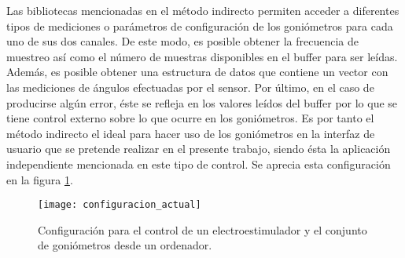 Las bibliotecas mencionadas en el método indirecto permiten acceder a diferentes tipos de mediciones o parámetros de configuración de los goniómetros para cada uno de sus dos canales. De este modo, es posible obtener la frecuencia de muestreo así como el número de muestras disponibles en el buffer para ser leídas. Además, es posible obtener una estructura de datos que contiene un vector con las mediciones de ángulos efectuadas por el sensor. Por último, en el caso de producirse algún error, éste se refleja en los valores leídos del buffer por lo que se tiene control externo sobre lo que ocurre en los goniómetros. Es por tanto el método indirecto el ideal para hacer uso de los goniómetros en la interfaz de usuario que se pretende realizar en el presente trabajo, siendo ésta la aplicación independiente mencionada en este tipo de control. Se aprecia esta configuración en la figura \ref{fig:configuracion_actual}.\\

\begin{figure}[!htb]
\centering
\texttt{[image: configuracion\_actual]}
  \caption{Configuración para el control de un electroestimulador y el conjunto de goniómetros desde un ordenador.}\label{fig:configuracion_actual}
\end{figure}





